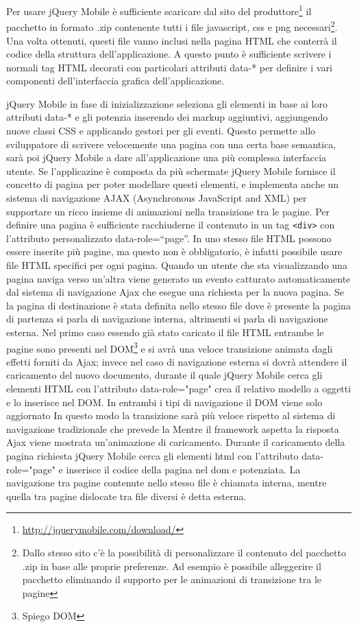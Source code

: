 			Per usare jQuery Mobile 
			è sufficiente scaricare dal sito del produttore\footnote{\url{http://jquerymobile.com/download/}}
			il pacchetto in formato .zip contenente tutti i file javascript, css
			e png necessari\footnote{Dallo stesso sito c'è la possibilità di personalizzare
			il contenuto del pacchetto .zip in base alle proprie preferenze. Ad esempio
			è possibile alleggerire il pacchetto eliminando il supporto per le
			animazioni di transizione tra le pagine}.
			Una volta ottenuti, questi file vanno inclusi nella pagina HTML che 
			conterrà il codice della struttura dell'applicazione.
			A questo punto è sufficiente scrivere i normali tag HTML decorati
			con particolari attributi data-* per definire i vari componenti 
			dell'interfaccia grafica dell'applicazione.
			
			jQuery Mobile in fase di 
			inizializzazione seleziona gli elementi in base ai loro
			attributi data-* e gli potenzia inserendo dei markup aggiuntivi, 
			aggiungendo nuove classi CSS e applicando gestori per gli eventi.
			Questo permette allo sviluppatore di scrivere velocemente una pagina
			con una certa base semantica, sarà poi jQuery Mobile a dare 
			all'applicazione una più complessa interfaccia utente.
			Se l'applicazine è composta da più schermate jQuery Mobile fornisce 
			il concetto di pagina per poter modellare questi elementi, e implementa
			anche un sistema di navigazione AJAX (Asynchronous JavaScript and XML) 
			per supportare un ricco insieme di animazioni nella transizione tra le pagine. 
			Per definire una pagina è sufficiente racchiuderne il contenuto in
			un tag \verb+<div>+ con l'attributo personalizzato data-role=``page''.
			In uno stesso file HTML possono essere inserite più pagine, ma questo 
			non è obbligatorio, è infatti possibile usare file HTML specifici 
			per ogni pagina. Quando un utente che sta visualizzando una pagina
			naviga verso un'altra viene generato un evento 
			catturato automaticamente dal sistema di navigazione Ajax che esegue
			una richiesta per la nuova pagina. Se la pagina di destinazione è stata
			definita nello stesso file dove è presente la pagina di partenza si 
			parla di navigazione interna, altrimenti si parla di navigazione esterna.
			Nel primo caso essendo già stato caricato il file HTML entrambe le pagine
			sono presenti nel DOM\footnote{Spiego DOM} e si avrà una veloce transizione 
			animata dagli effetti forniti da Ajax; invece nel caso di navigazione esterna
			si dovrà attendere il caricamento del nuovo documento, durante il quale
			jQuery Mobile cerca gli elementi HTML con l'attributo data-role="page"
			crea il relativo modello a oggetti e lo inserisce nel DOM. 
			In entrambi i tipi di navigazione il DOM viene solo aggiornato In questo modo la transizione
			sarà più veloce rispetto al sistema di navigazione tradizionale che 
			prevede la    
			Mentre il framework aspetta la risposta Ajax viene mostrata
			un'animazione di caricamento. Durante il caricamento della pagina richiesta
			jQuery Mobile cerca gli elementi html con l'attributo data-role="page"
			e inserisce il codice della pagina nel dom e potenziata.
			La navigazione tra pagine contenute nello stesso file
			è chiamata interna, mentre quella tra pagine dislocate tra file diversi 
			è detta esterna.  
			
